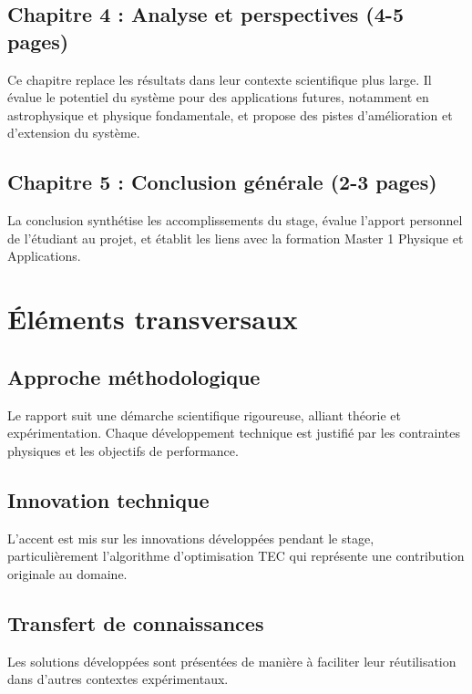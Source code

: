\subsection*{Chapitre 4 : Analyse et perspectives (4-5 pages)}
Ce chapitre replace les résultats dans leur contexte scientifique plus large. Il évalue le potentiel du système pour des applications futures, notamment en astrophysique et physique fondamentale, et propose des pistes d'amélioration et d'extension du système.

\subsection*{Chapitre 5 : Conclusion générale (2-3 pages)}
La conclusion synthétise les accomplissements du stage, évalue l'apport personnel de l'étudiant au projet, et établit les liens avec la formation Master 1 Physique et Applications.

\section*{Éléments transversaux}

\subsection*{Approche méthodologique}
Le rapport suit une démarche scientifique rigoureuse, alliant théorie et expérimentation. Chaque développement technique est justifié par les contraintes physiques et les objectifs de performance.

\subsection*{Innovation technique}
L'accent est mis sur les innovations développées pendant le stage, particulièrement l'algorithme d'optimisation TEC qui représente une contribution originale au domaine.

\subsection*{Transfert de connaissances}
Les solutions développées sont présentées de manière à faciliter leur réutilisation dans d'autres contextes expérimentaux.

\newpage